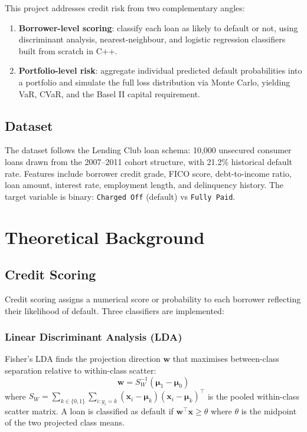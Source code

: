 \documentclass[12pt,a4paper]{article}
\begin{document}
This project addresses credit risk from two complementary angles:
\begin{enumerate}[leftmargin=2em]
  \item \textbf{Borrower-level scoring}: classify each loan as likely to default
        or not, using discriminant analysis, nearest-neighbour, and logistic
        regression classifiers built from scratch in C++.
  \item \textbf{Portfolio-level risk}: aggregate individual predicted default
        probabilities into a portfolio and simulate the full loss distribution
        via Monte Carlo, yielding VaR, CVaR, and the Basel II capital requirement.
\end{enumerate}

\subsection{Dataset}

The dataset follows the Lending Club loan schema: 10,000 unsecured consumer
loans drawn from the 2007--2011 cohort structure, with 21.2\% historical default
rate. Features include borrower credit grade, FICO score, debt-to-income ratio,
loan amount, interest rate, employment length, and delinquency history. The
target variable is binary: \texttt{Charged Off} (default) vs \texttt{Fully Paid}.

\section{Theoretical Background}

\subsection{Credit Scoring}

Credit scoring assigns a numerical score or probability to each borrower
reflecting their likelihood of default. Three classifiers are implemented:

\subsubsection{Linear Discriminant Analysis (LDA)}

Fisher's LDA finds the projection direction $\mathbf{w}$ that maximises
between-class separation relative to within-class scatter:
\begin{equation}
  \mathbf{w} = S_W^{-1}(\boldsymbol{\mu}_1 - \boldsymbol{\mu}_0)
  \label{eq:lda}
\end{equation}
where $S_W = \sum_{k\in\{0,1\}}\sum_{i:y_i=k}(\mathbf{x}_i - \boldsymbol{\mu}_k)(\mathbf{x}_i - \boldsymbol{\mu}_k)^\top$
is the pooled within-class scatter matrix. A loan is classified as default if
$\mathbf{w}^\top\mathbf{x} \geq \theta$ where $\theta$ is the midpoint of the
two projected class means.
\end{document}
